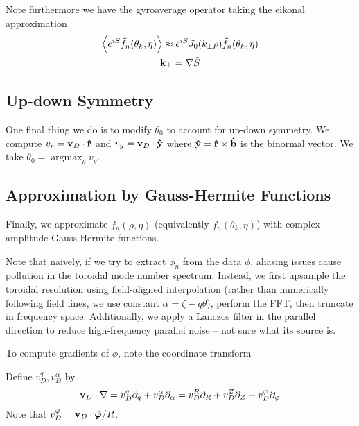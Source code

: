 \documentclass[]{article}
\begin{document}
Note furthermore we have the gyroaverage operator taking the eikonal approximation
\begin{gather*}
	\ev{e^{i\tilde{S}}\tilde{f}_n(\theta_k, \eta)} \approx e^{i\tilde{S}} J_0(k_\perp \rho) \tilde{f}_n(\theta_k, \eta) \\
	\vb{k}_\perp = \nabla \tilde{S}
\end{gather*}

\subsection{Up-down Symmetry}
One final thing we do is to modify \(\theta_0\) to account for up-down symmetry.
We compute \(v_r = \vb{v}_D \cdot \vu{r}\) and \(v_y = \vb{v}_D \cdot \vu{y}\) where \(\vu{y} = \vu{r} \times \vu{b}\) is the binormal vector.
We take \(\theta_0 = \operatorname{argmax}_{\theta} v_y\).

\subsection{Approximation by Gauss-Hermite Functions}

Finally, we approximate \(f_n(\rho,\eta)\) (equivalently \(\tilde{f}_n(\theta_k, \eta)\)) with complex-amplitude Gauss-Hermite functions.

Note that naively, if we try to extract \(\phi_n\) from the data \(\phi\), aliasing issues cause pollution in the toroidal mode number spectrum.
Instead, we first upsample the toroidal resolution using field-aligned interpolation (rather than numerically following field lines, we use constant \(\alpha=\zeta - q \theta\)), perform the FFT, then truncate in frequency space.
Additionally, we apply a Lanczos filter in the parallel direction to reduce high-frequency parallel noise -- not sure what its source is.

To compute gradients of \(\phi\), note the coordinate transform

Define \(v_D^q,v_D^\alpha\) by
\begin{equation*}
	\vb{v}_D\cdot \nabla = v_D^q \partial_q + v_D^\alpha \partial_\alpha = v_D^R \partial_R + v_D^Z \partial_Z + v_D^\varphi \partial_\varphi
\end{equation*}
Note that \(v_D^\varphi = \vb{v}_D \cdot \vu*{\varphi} / R\).
\end{document}
